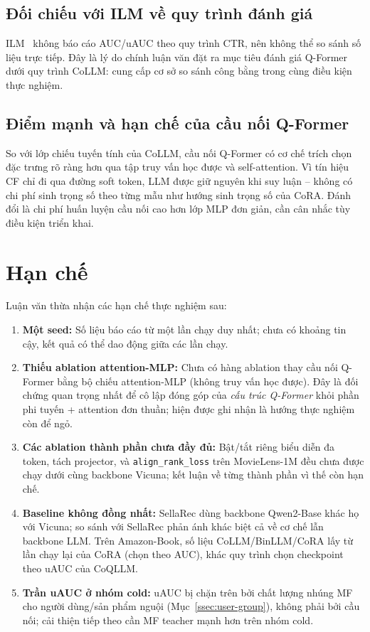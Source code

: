 \subsection{Đối chiếu với ILM về quy trình đánh giá}
\label{ssec:doi-chieu-ilm}

ILM~\cite{ilm2024} không báo cáo AUC/uAUC theo quy trình CTR, nên không thể so sánh
số liệu trực tiếp. Đây là lý do chính luận văn đặt ra mục tiêu đánh giá Q-Former dưới
quy trình CoLLM: cung cấp cơ sở so sánh công bằng trong cùng điều kiện thực nghiệm.

\subsection{Điểm mạnh và hạn chế của cầu nối Q-Former}
\label{ssec:diem-manh-han-che}

So với lớp chiếu tuyến tính của CoLLM, cầu nối Q-Former có cơ chế trích chọn đặc trưng rõ
ràng hơn qua tập truy vấn học được và self-attention. Vì tín hiệu CF chỉ đi qua đường soft token, LLM
được giữ nguyên khi suy luận -- không có chi phí sinh trọng số theo từng mẫu như hướng sinh
trọng số của CoRA. Đánh đổi là chi phí huấn luyện cầu nối cao hơn lớp MLP đơn giản, cần cân
nhắc tùy điều kiện triển khai.

\section{Hạn chế}
\label{sec:han-che}

Luận văn thừa nhận các hạn chế thực nghiệm sau:
\begin{enumerate}
    \item \textbf{Một seed:} Số liệu báo cáo từ một lần chạy duy nhất; chưa có khoảng tin
    cậy, kết quả có thể dao động giữa các lần chạy.
    \item \textbf{Thiếu ablation attention-MLP:} Chưa có hàng ablation thay cầu nối
    Q-Former bằng bộ chiếu attention-MLP (không truy vấn học được). Đây là đối chứng quan
    trọng nhất để cô lập đóng góp của \textit{cấu trúc Q-Former} khỏi phần phi tuyến +
    attention đơn thuần; hiện được ghi nhận là hướng thực nghiệm còn để ngỏ.
    \item \textbf{Các ablation thành phần chưa đầy đủ:} Bật/tắt riêng biểu diễn đa token,
    tách projector, và \texttt{align\_rank\_loss} trên MovieLens-1M đều chưa được chạy
    dưới cùng backbone Vicuna; kết luận về từng thành phần vì thế còn hạn chế.
    \item \textbf{Baseline không đồng nhất:} SellaRec dùng backbone Qwen2-Base khác họ với
    Vicuna; so sánh với SellaRec phản ánh khác biệt cả về cơ chế lẫn backbone LLM. Trên
    Amazon-Book, số liệu CoLLM/BinLLM/CoRA lấy từ lần chạy lại của CoRA (chọn theo AUC),
    khác quy trình chọn checkpoint theo uAUC của CoQLLM.
    \item \textbf{Trần uAUC ở nhóm cold:} uAUC bị chặn trên bởi chất lượng nhúng MF cho
    người dùng/sản phẩm nguội (Mục~\ref{ssec:user-group}), không phải bởi cầu nối; cải
    thiện tiếp theo cần MF teacher mạnh hơn trên nhóm cold.
\end{enumerate}
